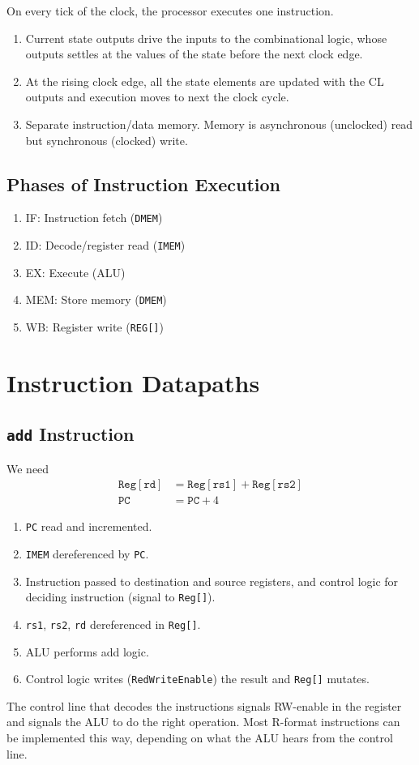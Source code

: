 On every tick of the clock, the processor executes one instruction.

\begin{enumerate}
    \item Current state outputs drive the inputs to the combinational logic, whose outputs settles at the values of the state before the next clock edge.
    \item At the rising clock edge, all the state elements are updated with the CL outputs and execution moves to next the clock cycle.
    \item Separate instruction/data memory. Memory is asynchronous (unclocked) read but synchronous (clocked) write.
\end{enumerate}

\subsection{Phases of Instruction Execution}
\begin{enumerate}
	\item IF: Instruction fetch (\texttt{DMEM})
	\item ID: Decode/register read (\texttt{IMEM})
	\item EX: Execute (ALU)
	\item MEM: Store memory (\texttt{DMEM})
	\item WB: Register write (\texttt{REG[]})
\end{enumerate}

\section{Instruction Datapaths}
\subsection{\texttt{add} Instruction}
We need
\begin{align}
\texttt{Reg}\left[\texttt{rd}\right] &= \texttt{Reg}\left[\texttt{rs1}\right] + \texttt{Reg}\left[\texttt{rs2}\right] \\
\texttt{PC} &= \texttt{PC} + 4
\end{align}

\begin{enumerate}
	\item \texttt{PC} read and incremented.
	\item \texttt{IMEM} dereferenced by \texttt{PC}.
	\item Instruction passed to destination and source registers, and control logic for deciding instruction (signal to \texttt{Reg[]}).
	\item \texttt{rs1}, \texttt{rs2}, \texttt{rd} dereferenced in \texttt{Reg[]}.
	\item ALU performs add logic.
	\item Control logic writes (\texttt{RedWriteEnable}) the result and \texttt{Reg[]} mutates.
\end{enumerate}
The control line that decodes the instructions signals RW-enable in the register and signals the ALU to do the right operation. Most R-format instructions can be implemented this way, depending on what the ALU hears from the control line.

